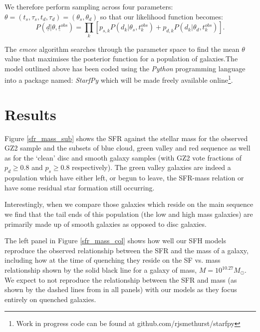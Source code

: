 \documentclass{mn2e}
\begin{document}
We therefore perform sampling across four parameters: $\theta = (t_{s}, \tau_{s}, t_{d}, \tau_{d}) = (\theta_{s}, \theta_{d})$ so that our likelihood function becomes:
\begin{equation}
P(\underline{d}|\theta, \underline{t}^{obs}) = \prod_{k} \left [p_{s, k} P(d_{k}|\theta_{s}, t_{k}^{obs}) + p_{d, k} P(d_{k}|\theta_{d}, t_{k}^{obs}) \right].
\end{equation}


The \emph{emcee} algorithm searches through the parameter space to find the mean $\theta$ value that maximises the posterior function  for a population of galaxies.The model outlined above has been coded using the \emph{Python} programming language into a package named: \emph{StarfPy} which will be made freely available online\footnote{Work in progress code can be found at github.com/rjsmethurst/starfpy}.

\section{Results}
Figure \ref{sfr_mass_sub} shows the SFR against the stellar mass for the observed GZ2 sample and the subsets of blue cloud, green valley and red sequence as well as for the `clean' disc and smooth galaxy samples (with GZ2 vote fractions of $p_d \geq 0.8$ and $p_s \geq 0.8$ respectively). The green valley galaxies are indeed a population which have either left, or begun to leave, the SFR-mass relation or have some residual star formation still occurring. 

Interestingly, when we compare those galaxies which reside on the main sequence we find that the tail ends of this population (the low and high mass  galaxies) are primarily made up of smooth galaxies as opposed to disc galaxies.

The left panel in Figure \ref{sfr_mass_col} shows how well our SFH models reproduce the observed relationship between the SFR and the mass of a galaxy, including how at the time of quenching they reside on the SF vs. mass relationship shown by the solid black line for a galaxy of mass, $M = 10^{10.27} M_{\odot}$.  We expect to not reproduce the relationship between the SFR and mass (as shown by the dashed lines from \citealt{Peng} in all panels) with our models as they focus entirely on quenched galaxies. 
\end{document}
